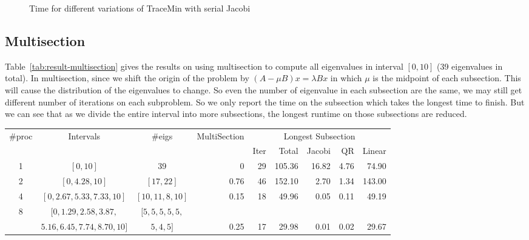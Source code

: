 \begin{figure}[htbp]
	\centering
	\caption{Time for different variations of TraceMin with serial Jacobi}
  \label{fig:timenodes}
\end{figure}

\subsection{Multisection}
Table~\ref{tab:result-multisection} gives the results on using multisection to compute all eigenvalues in interval $[0, 10]$ (39 eigenvalues in total). In multisection, since we shift the origin of the problem by $(A - \mu B) x = \lambda B x$ in which $\mu$ is the midpoint of each subsection. This will cause the distribution of the eigenvalues to change. So even the number of eigenvalue in each subsection are the same, we may still get different number of iterations on each subproblem. So we only report the time on the subsection which takes the longest time to finish. But we can see that as we divide the entire interval into more subsections, the longest runtime on those subsections are reduced. 

\begin{table*}
\begin{center}
\begin{tabular}{|c | c | c | r | r | r | r | r | r |}
\hline
$\#$proc & Intervals & $\#$eigs & MultiSection & \multicolumn{5}{|c|}{Longest Subsection} \\
  & & &  & Iter & Total & Jacobi & QR & Linear \\
\hline
1 & $[0, 10]$ & 39 & 0 & 29 & 105.36 & 16.82 & 4.76 & 74.90 \\
2 & $[0, 4.28, 10]$ & $[17, 22]$ & 0.76 &  46 & 152.10 & 2.70 & 1.34 & 143.00\\
4 & $[0, 2.67, 5.33, 7.33, 10]$ & $[10, 11, 8, 10]$ & 0.15 & 18 & 49.96 & 0.05 & 0.11 & 49.19 \\
8 &$[0, 1.29, 2.58, 3.87, $ & $[5, 5, 5, 5, 5,$ & &  & & & & \\
& $5.16, 6.45, 7.74, 8.70, 10]$& $5, 4, 5]$& 0.25 & 17 & 29.98 & 0.01 & 0.02 & 29.67\\
\hline
\end{tabular}
\caption{Multisection result on $[0, 10]$ for the $10000 \times 10000$ generated matrix $A$ and $B$.}
\label{tab:result-multisection}
\end{center}
\end{table*}

